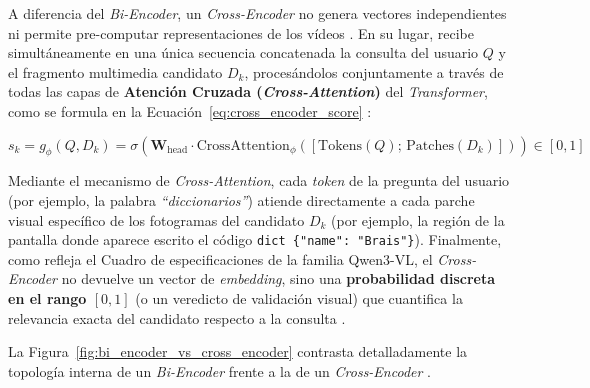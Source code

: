 A diferencia del \textit{Bi-Encoder}, un \textit{Cross-Encoder} no genera vectores independientes ni permite pre-computar representaciones de los vídeos \cite{learnopencv_qwen3}. En su lugar, recibe simultáneamente en una única secuencia concatenada la consulta del usuario $Q$ y el fragmento multimedia candidato $D_k$, procesándolos conjuntamente a través de todas las capas de \textbf{Atención Cruzada (\textit{Cross-Attention})} del \textit{Transformer}, como se formula en la Ecuación~\eqref{eq:cross_encoder_score} \cite{learnopencv_qwen3, qwen3_vl_emb2026}:

\begin{equation}
s_k = g_{\phi}(Q, D_k) = \sigma\!\left(\mathbf{W}_{\text{head}} \cdot \text{CrossAttention}_{\phi}\!\left([\text{Tokens}(Q); \, \text{Patches}(D_k)]\right)\right) \in [0, 1]
\label{eq:cross_encoder_score}
\end{equation}

Mediante el mecanismo de \textit{Cross-Attention}, cada \textit{token} de la pregunta del usuario (por ejemplo, la palabra \textit{``diccionarios''}) atiende directamente a cada parche visual específico de los fotogramas del candidato $D_k$ (por ejemplo, la región de la pantalla donde aparece escrito el código \texttt{dict \{"name": "Brais"\}}). Finalmente, como refleja el Cuadro de especificaciones de la familia Qwen3-VL, el \textit{Cross-Encoder} no devuelve un vector de \textit{embedding}, sino una \textbf{probabilidad discreta en el rango $[0, 1]$} (o un veredicto de validación visual) que cuantifica la relevancia exacta del candidato respecto a la consulta \cite{qwen3_vl_emb2026}.

La Figura~\ref{fig:bi_encoder_vs_cross_encoder} contrasta detalladamente la topología interna de un \textit{Bi-Encoder} frente a la de un \textit{Cross-Encoder} \cite{learnopencv_qwen3, qwen3_vl_emb2026}.

